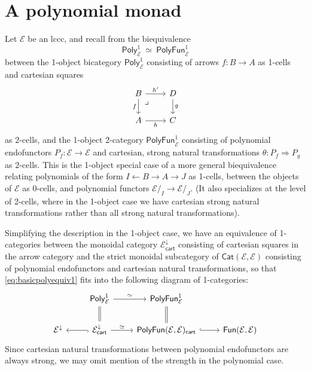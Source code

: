 \documentclass[12pt,reqno]{amsart}
\newcommand{\ednote}[1]{[\textit{\color{red}{#1}}]} %
\newcommand{\DD}{\ensuremath{\mathcal{D}}}
\newcommand{\EE}{\ensuremath{\mathcal{E}}}
\newcommand{\Cat}{\ensuremath{\mathsf{Cat}}}
\newcommand{\alg}[1]{\ensuremath{\mathsf{#1}}}
\renewcommand{\to}{\ensuremath{\rightarrow}}
\renewcommand{\t}{\ensuremath{\mathsf{u}}}
\newcommand{\pbcorner}{\arrow[dr,phantom,"\lrcorner" very near start, shift right=.5ex]} %
\theoremstyle{remark}
\theoremstyle{definition}
\begin{document}
\section{A polynomial monad}\label{sec:Monad}
%
%
%

Let $\EE$ be an lccc, and recall from \cite[Theorem 2.17]{GambinoKoch:2013} the biequivalence 
\begin{equation}\label{eq:basicpolyequiv1}
\mathsf{Poly}^1_{\EE}\ \simeq\ \mathsf{PolyFun}^1_{\EE}
\end{equation}
between the 1-object bicategory $\mathsf{Poly}^1_{\EE}$ consisting of arrows $f:B \to A$ as 1-cells and cartesian squares
\begin{equation}\label{diag:cartsquare}
\begin{tikzcd}
B \ar[d,swap, "f"] \ar[r, "{h'}"] \pbcorner & D \ar[d, "g"] \\
A \ar[r,swap, "{h}"] &  C 
\end{tikzcd}
\end{equation}
as 2-cells, and the 1-object 2-category $\mathsf{PolyFun}^1_{\EE}$ consisting of polynomial endofunctors $P_f: \EE\to \EE$ and cartesian, strong natural transformations $\theta : P_f \Rightarrow P_g$ as 2-cells.  This is the 1-object special case of a more general biequivalence relating polynomials of the form $I \leftarrow B \to A \to J$ as 1-cells, between the objects of $\EE$ as 0-cells, and polynomial functors $\EE/_I \to \EE/_J$. (It also specializes at the level of 2-cells, where in the 1-object case we have cartesian strong natural transformations rather than all strong natural transformations).  

Simplifying the description in the 1-object case, we have an equivalence of 1-categories between the monoidal category $\EE^{\downarrow}_{\mathsf{cart}}$ consisting of cartesian squares in the arrow category and the strict monoidal subcategory of $\Cat(\EE, \EE)$ consisting of polynomial endofunctors and cartesian natural transformations, so that \eqref{eq:basicpolyequiv1} fits into the following diagram of 1-categories:
\begin{equation}\label{diagram:polyandpolyfun}
\begin{tikzcd}
& \mathsf{Poly}^1_{\EE} \ar[d,equals] \ar[r,"{\simeq}"] & \mathsf{PolyFun}^1_{\EE}  \ar[d,equals] &\\
\EE^{\downarrow}  &\EE^{\downarrow}_{\mathsf{cart}} \ar[l, hook] \ar[r,"{\simeq}"] & \mathsf{PolyFun}(\EE, \EE)_{\mathsf{cart}}  \ar[r, hook] & \mathsf{Fun}(\EE, \EE)
\end{tikzcd}
\end{equation}
Since cartesian natural transformations between polynomial endofunctors are always strong, we may omit mention of the strength in the polynomial case.
\end{document}
